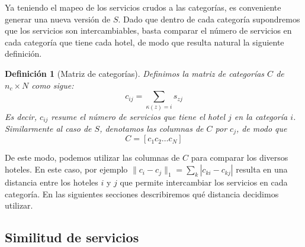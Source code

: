 \documentclass[12pt]{report}
\newtheorem{defn}{Definici\'on}[chapter]
\begin{document}
Ya teniendo el mapeo de los servicios crudos a las categorías, es conveniente generar una nueva versión de $S$. Dado que dentro de cada categoría supondremos que los servicios son intercambiables, basta comparar el número de servicios en cada categoría que tiene cada hotel, de modo que resulta natural la siguiente definición.
\begin{defn}[Matriz de categorías]
Definimos la matriz de categorías $C$ de $n_c \times N$ como sigue:
\[
c_{ij} = \sum_{\kappa(z) = i} s_{zj}
\]
Es decir, $c_{ij}$ resume el número de servicios que tiene el hotel $j$ en la categoría $i$. Similarmente al caso de $S$, denotamos las columnas de $C$ por $c_j$, de modo que
\[
C = [c_1 c_2 \dots c_N]
\]
\end{defn}
De este modo, podemos utilizar las columnas de $C$ para comparar los diversos hoteles. En este caso, por ejemplo $\|c_i - c_j\|_1 = \sum_k |c_{ki} - c_{kj}|$ resulta en una distancia entre los hoteles $i$ y $j$ que permite intercambiar los servicios en cada categoría. En las siguientes secciones describiremos qué distancia decidimos utilizar.

\subsection*{Similitud de servicios}
\end{document}
